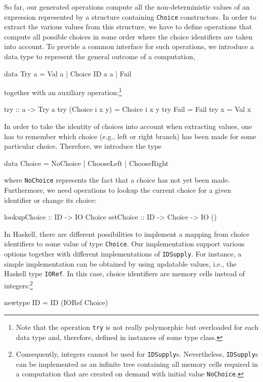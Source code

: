 \documentclass{llncs}
\newcommand{\code}[1]{\mbox{\small\texttt{#1}}}
\begin{document}
So far, our generated operations compute all the non-deterministic
values of an expression represented by a structure containing
\code{Choice} constructors. In order to extract the various
values from this structure, we have to define operations
that compute all possible choices in some order where the choice identifiers
are taken into account.
To provide a common interface for such operations, we introduce
a data type to represent the general outcome of a computation,
\begin{haskell}
  data Try a = Val a | Choice ID a a | Fail
\end{haskell}
together with an auxiliary operation:\footnote{Note that the
operation \code{try} is not really polymorphic but overloaded
for each data type and, therefore, defined in instances of some type class.}
\begin{haskell}
  try :: a -> Try a
  try (Choice i x y) = Choice i x y
  try Fail           = Fail
  try x              = Val x
\end{haskell}
In order to take the identity of choices into account when extracting values,
one has to remember which choice (e.g., left or right branch)
has been made for some particular choice.
Therefore, we introduce the type
\begin{haskell}
  data Choice = NoChoice | ChooseLeft | ChooseRight
\end{haskell}
where \code{NoChoice} represents the fact that a choice has not yet been made.
Furthermore, we need operations to lookup the current choice
for a given identifier or change its choice:
\begin{haskell}
  lookupChoice :: ID -> IO Choice
  setChoice    :: ID -> Choice -> IO ()
\end{haskell}
In Haskell, there are different possibilities to implement a mapping
from choice identifiers to some value of type \code{Choice}.
Our implementation support various options together with different
implementations of \code{IDSupply}.
For instance, a simple implementation can be obtained by
using updatable values, i.e., the Haskell type \code{IORef}.
In this case, choice identifiers are memory cells instead of integers:\footnote{%
Consequently, integers cannot be used for \code{IDSupply}s. Nevertheless,
\code{IDSupply}s can be implemented as an infinite tree containing
all memory cells required in a computation that are created
on demand with initial value \code{NoChoice}.}
\begin{haskell}
  newtype ID = ID (IORef Choice)
\end{haskell}
\end{document}
